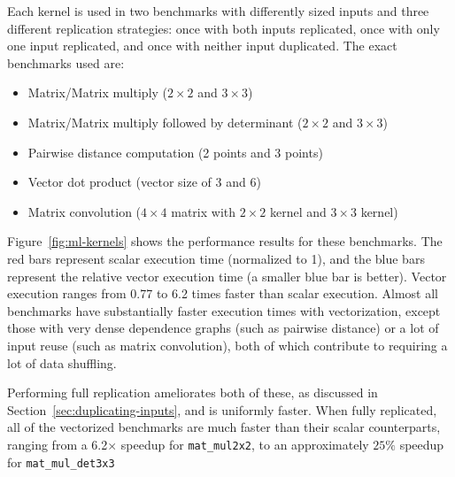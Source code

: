 Each kernel is used in two benchmarks with differently sized inputs and three different replication strategies: once with both inputs replicated, once with only one input replicated, and once with neither input duplicated. 
The exact benchmarks used are:
\begin{itemize}
    \item Matrix/Matrix multiply ($2 \times 2$ and $3 \times 3$)
    \item Matrix/Matrix multiply followed by determinant ($2 \times 2$ and $3 \times 3$)
    \item Pairwise distance computation (2 points and 3 points)
    \item Vector dot product (vector size of 3 and 6)
    \item Matrix convolution ($4 \times 4$ matrix with $2 \times 2$ kernel and $3 \times 3$ kernel)
\end{itemize}

Figure~\ref{fig:ml-kernels} shows the performance results for these benchmarks.
The red bars represent scalar execution time (normalized to 1), and the blue bars represent the relative vector execution time (a smaller blue bar is better).
Vector execution ranges from 0.77 to 6.2 times faster than scalar execution.
Almost all benchmarks have substantially faster execution times with vectorization, except those with very dense dependence graphs (such as pairwise distance) or a lot of input reuse (such as matrix convolution), both of which contribute to requiring a lot of data shuffling.


Performing full replication ameliorates both of these, as discussed in Section~\ref{sec:duplicating-inputs}, and is uniformly faster.
When fully replicated, all of the vectorized benchmarks are much faster than their scalar counterparts, ranging from a 6.2$\times$ speedup for \texttt{mat\_mul2x2}, to an approximately $25\%$ speedup for \texttt{mat\-\_mul\-\_det3x3}

